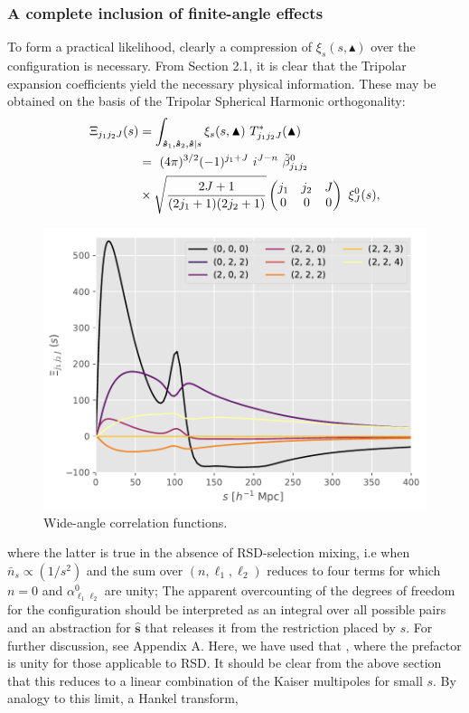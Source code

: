 \documentclass[useAMS,usenatbib]{mn2e}
\newcommand{\tj}[6]{ \begin{pmatrix}
   #1 & #2 & #3 \\
   #4 & #5 & #6 
  \end{pmatrix}}
\begin{document}
\subsubsection{A complete inclusion of finite-angle effects}
To form a practical likelihood, clearly a compression of $\xi_s(s, \blacktriangle)$ over the configuration is necessary.  From Section 2.1, it is clear that the Tripolar expansion coefficients yield the necessary physical information.  These may be obtained on the basis of the Tripolar Spherical Harmonic orthogonality:
\begin{align}
\Xi_{j_1 j_2 J}(s) &= \int_{\boldsymbol {\hat s}_1, \boldsymbol {\hat s}_2,  \boldsymbol {\hat s} | s} \xi_s(s, \blacktriangle) \ T^{*}_{j_1 j_2 J}(\blacktriangle) \notag \\ 
&= %
\ (4 \pi)^{3/2} (-1)^{j_1 + J} \ i^{J-n} \ \tilde{\beta}^{0}_{j_1 j_2} \notag \\ &\times \sqrt{\frac{2J+1}{(2 j_1 + 1)(2 j_2 + 1)}} \tj{j_1}{j_2}{J}{0}{0}{0} \ \xi^{0}_J(s),   
\end{align}
\begin{figure}
    \centering
    \includegraphics[scale=0.55]{XI.pdf}
    \caption{Wide-angle correlation functions.}
    \label{fig:XI}
\end{figure}
where the latter is true in the absence of RSD-selection mixing, i.e when $\bar n_s \propto (1/s^2)$ and the sum over $(n, \ell_1, \ell_2)$ reduces to four terms for which $n=0$ and $\alpha^{0}_{\ell_1 \ell_2}$ are unity; The apparent overcounting of the degrees of freedom for the configuration should be interpreted as an integral over all possible pairs and an abstraction for $\boldsymbol{\hat s}$ that releases it from the restriction placed by $s$.  For further discussion, see Appendix A.  Here, we have used that , where the prefactor is unity for those applicable to RSD.  It should be clear from the above section that this reduces to a linear combination of the Kaiser multipoles for small $s$.  By analogy to this limit, a Hankel transform,
\end{document}
